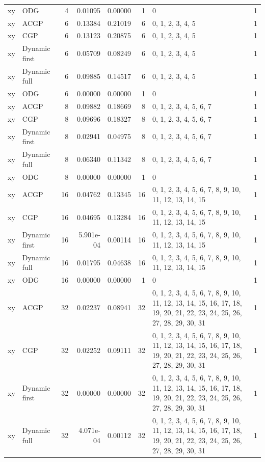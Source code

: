 \documentclass[10pt,a4paper]{article}
\begin{document}
\begin{longtable}{@{}p{23mm}p{29mm}rrrrp{36mm}r@{}}
xy & ODG & 4 & 0.01095 & 0.00000 & 1 & 0 & 1 \\
xy & ACGP & 6 & 0.13384 & 0.21019 & 6 & 0, 1, 2, 3, 4, 5 & 1 \\
xy & CGP & 6 & 0.13123 & 0.20875 & 6 & 0, 1, 2, 3, 4, 5 & 1 \\
xy & Dynamic first & 6 & 0.05709 & 0.08249 & 6 & 0, 1, 2, 3, 4, 5 & 1 \\
xy & Dynamic full & 6 & 0.09885 & 0.14517 & 6 & 0, 1, 2, 3, 4, 5 & 1 \\
xy & ODG & 6 & 0.00000 & 0.00000 & 1 & 0 & 1 \\
xy & ACGP & 8 & 0.09882 & 0.18669 & 8 & 0, 1, 2, 3, 4, 5, 6, 7 & 1 \\
xy & CGP & 8 & 0.09696 & 0.18327 & 8 & 0, 1, 2, 3, 4, 5, 6, 7 & 1 \\
xy & Dynamic first & 8 & 0.02941 & 0.04975 & 8 & 0, 1, 2, 3, 4, 5, 6, 7 & 1 \\
xy & Dynamic full & 8 & 0.06340 & 0.11342 & 8 & 0, 1, 2, 3, 4, 5, 6, 7 & 1 \\
xy & ODG & 8 & 0.00000 & 0.00000 & 1 & 0 & 1 \\
xy & ACGP & 16 & 0.04762 & 0.13345 & 16 & 0, 1, 2, 3, 4, 5, 6, 7, 8, 9, 10, 11, 12, 13, 14, 15 & 1 \\
xy & CGP & 16 & 0.04695 & 0.13284 & 16 & 0, 1, 2, 3, 4, 5, 6, 7, 8, 9, 10, 11, 12, 13, 14, 15 & 1 \\
xy & Dynamic first & 16 & 5.901e-04 & 0.00114 & 16 & 0, 1, 2, 3, 4, 5, 6, 7, 8, 9, 10, 11, 12, 13, 14, 15 & 1 \\
xy & Dynamic full & 16 & 0.01795 & 0.04638 & 16 & 0, 1, 2, 3, 4, 5, 6, 7, 8, 9, 10, 11, 12, 13, 14, 15 & 1 \\
xy & ODG & 16 & 0.00000 & 0.00000 & 1 & 0 & 1 \\
xy & ACGP & 32 & 0.02237 & 0.08941 & 32 & 0, 1, 2, 3, 4, 5, 6, 7, 8, 9, 10, 11, 12, 13, 14, 15, 16, 17, 18, 19, 20, 21, 22, 23, 24, 25, 26, 27, 28, 29, 30, 31 & 1 \\
xy & CGP & 32 & 0.02252 & 0.09111 & 32 & 0, 1, 2, 3, 4, 5, 6, 7, 8, 9, 10, 11, 12, 13, 14, 15, 16, 17, 18, 19, 20, 21, 22, 23, 24, 25, 26, 27, 28, 29, 30, 31 & 1 \\
xy & Dynamic first & 32 & 0.00000 & 0.00000 & 32 & 0, 1, 2, 3, 4, 5, 6, 7, 8, 9, 10, 11, 12, 13, 14, 15, 16, 17, 18, 19, 20, 21, 22, 23, 24, 25, 26, 27, 28, 29, 30, 31 & 1 \\
xy & Dynamic full & 32 & 4.071e-04 & 0.00112 & 32 & 0, 1, 2, 3, 4, 5, 6, 7, 8, 9, 10, 11, 12, 13, 14, 15, 16, 17, 18, 19, 20, 21, 22, 23, 24, 25, 26, 27, 28, 29, 30, 31 & 1 \\

\end{longtable}
\end{document}
